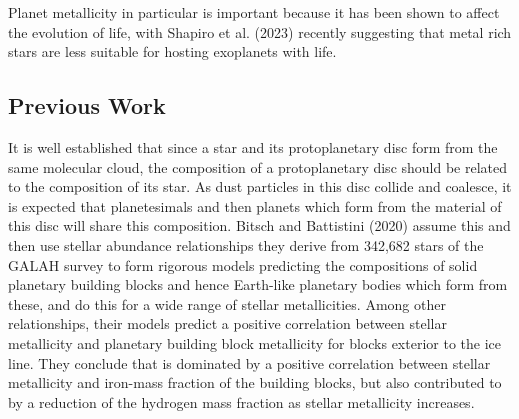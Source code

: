 \documentclass[a4paper,twocolumn,12pt]{article}
\begin{document}



Planet metallicity in particular is important because it has been shown to affect the evolution of life, with Shapiro et al. (2023) \cite{Shapiro} recently suggesting that metal rich stars are less suitable for hosting exoplanets with life.

\subsection{Previous Work}
\label{subsection: Previous Work}
It is well established that since a star and its protoplanetary disc form from the same molecular cloud, the composition of a protoplanetary disc should be related to the composition of its star. As dust particles in this disc collide and coalesce, it is expected that planetesimals and then planets which form from the material of this disc will share this composition. Bitsch and Battistini (2020)\cite{Bitsch&BattistiniTheoreticalModel} assume this and then use stellar abundance relationships they derive from 342,682 stars of the GALAH survey to form rigorous models predicting the compositions of solid planetary building blocks and hence Earth-like planetary bodies which form from these, and do this for a wide range of stellar metallicities. Among other relationships, their models predict a positive correlation between stellar metallicity and planetary building block metallicity for blocks exterior to the ice line. They conclude that is dominated by a positive correlation between stellar metallicity and iron-mass fraction of the building blocks, but also contributed to by a reduction of the hydrogen mass fraction as stellar metallicity increases.
\end{document}
